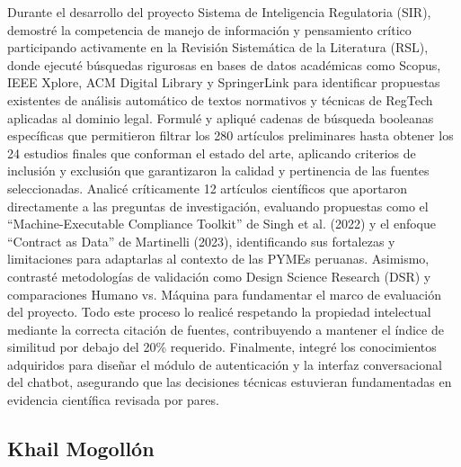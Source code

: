 \documentclass[12pt,a4paper,oneside]{report}
\begin{document}
Durante el desarrollo del proyecto Sistema de Inteligencia Regulatoria (SIR), demostré la competencia de manejo de información y pensamiento crítico participando activamente en la Revisión Sistemática de la Literatura (RSL), donde ejecuté búsquedas rigurosas en bases de datos académicas como Scopus, IEEE Xplore, ACM Digital Library y SpringerLink para identificar propuestas existentes de análisis automático de textos normativos y técnicas de RegTech aplicadas al dominio legal. Formulé y apliqué cadenas de búsqueda booleanas específicas que permitieron filtrar los 280 artículos preliminares hasta obtener los 24 estudios finales que conforman el estado del arte, aplicando criterios de inclusión y exclusión que garantizaron la calidad y pertinencia de las fuentes seleccionadas. Analicé críticamente 12 artículos científicos que aportaron directamente a las preguntas de investigación, evaluando propuestas como el ``Machine-Executable Compliance Toolkit'' de Singh et al. (2022) y el enfoque ``Contract as Data'' de Martinelli (2023), identificando sus fortalezas y limitaciones para adaptarlas al contexto de las PYMEs peruanas. Asimismo, contrasté metodologías de validación como Design Science Research (DSR) y comparaciones Humano vs. Máquina para fundamentar el marco de evaluación del proyecto. Todo este proceso lo realicé respetando la propiedad intelectual mediante la correcta citación de fuentes, contribuyendo a mantener el índice de similitud por debajo del 20\% requerido. Finalmente, integré los conocimientos adquiridos para diseñar el módulo de autenticación y la interfaz conversacional del chatbot, asegurando que las decisiones técnicas estuvieran fundamentadas en evidencia científica revisada por pares.

\subsection{Khail Mogollón}\label{subsec:khail-mogollon}
\end{document}
